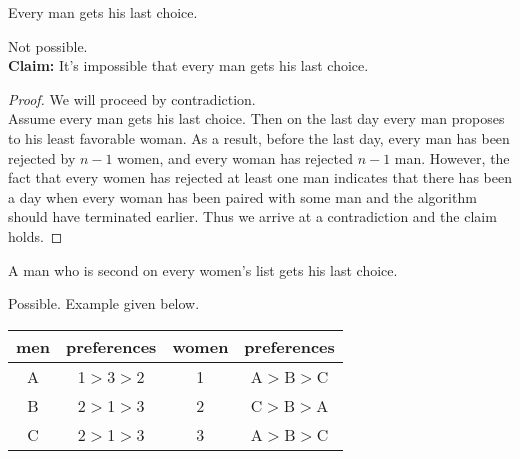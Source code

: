 \documentclass[11pt]{article}
\begin{document}
\begin{Parts}
        \Part Every man gets his last choice.

        \begin{Answer}
            Not possible. \\
            \textbf{Claim:} It's impossible that every man gets his last choice. 
            \begin{proof}
                We will proceed by contradiction. \\
                Assume every man gets his last choice. Then on the last day every man proposes to his least favorable woman. 
                As a result, before the last day, every man has been rejected by $n-1$ women, and every woman has rejected $n-1$ 
                man. However, the fact that every women has rejected at least one man indicates that there has been a day when
                every woman has been paired with some man and the algorithm should have terminated earlier. Thus we arrive at a 
                contradiction and the claim holds.  
            \end{proof}
        \end{Answer}

        \Part A man who is second on every women's list gets his last choice. 

        \begin{Answer}
            Possible. Example given below.
            \begin{center}
                \begin{tabular}{|c|c||c|c|}\hline
                    men&preferences&women & preferences \\
                    \hline
                    A& 1$>$3$>$2 &1& A$>$B$>$C \\
                    \hline
                    B& 2$>$1$>$3 &2& C$>$B$>$A \\
                    \hline
                    C& 2$>$1$>$3 &3& A$>$B$>$C \\
                    \hline
                \end{tabular}
            \end{center}
        \end{Answer}

    \end{Parts}

    \newpage
\end{document}
